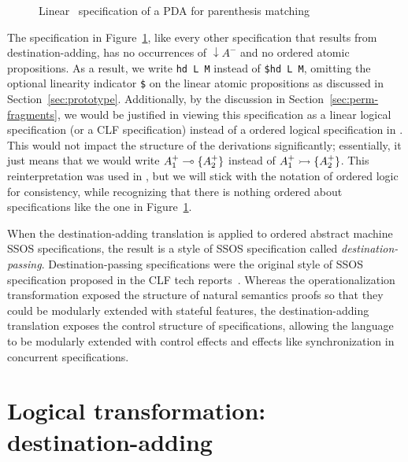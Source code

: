 \begin{figure}[ht]
\caption{Linear \sls~specification of a PDA for parenthesis matching}
\label{fig:pda-lin}
\end{figure}

The specification in Figure~\ref{fig:pda-lin}, like every other
specification that results from destination-adding, has no occurrences
of ${\downarrow}A^-$ and no ordered atomic propositions.  As a result,
we write \verb|hd L M| instead of \verb|$hd L M|, omitting the
optional linearity indicator \verb|$| on the linear atomic
propositions as discussed in
Section~\ref{sec:prototype}. Additionally, by the discussion in
Section~\ref{sec:perm-fragments}, we would be justified in viewing
this specification as a linear logical specification (or a CLF
specification) instead of a ordered logical specification in \sls.
This would not impact the structure of the derivations significantly;
essentially, it just means that we would write $A^+_1 \multimap \{ A^+_2
\}$ instead of $A^+_1 \rightarrowtail \{ A^+_2 \}$.  This reinterpretation was
used in \cite{simmons11logical}, but we will stick with the notation
of ordered logic for consistency, while recognizing that there is
nothing ordered about specifications like the one in
Figure~\ref{fig:pda-lin}.

When the destination-adding translation is applied to ordered abstract
machine SSOS specifications, the result is a style of SSOS
specification called {\it destination-passing}. Destination-passing
specifications were the original style of SSOS specification proposed
in the CLF tech reports~\cite{cervesato02concurrent}. Whereas the
operationalization transformation exposed the structure of natural
semantics proofs so that they could be modularly extended with
stateful features, the destination-adding translation exposes the
control structure of specifications, allowing the language to be
modularly extended with control effects and effects like
synchronization in concurrent specifications.

\section{Logical transformation: destination-adding}
\label{sec:destination-adding}

